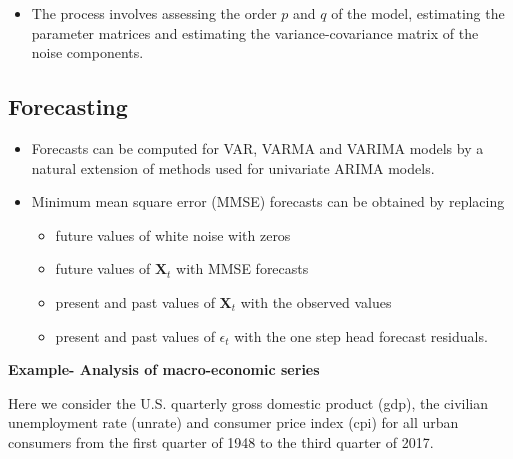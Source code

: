 \documentclass[]{book}
\providecommand{\tightlist}{%
  \setlength{\itemsep}{0pt}\setlength{\parskip}{0pt}}
\begin{document}
\begin{itemize}
\tightlist
\item
  The process involves assessing the order \(p\) and \(q\) of the model, estimating the parameter matrices and estimating the variance-covariance matrix of the noise components.
\end{itemize}

\hypertarget{forecasting-1}{%
\subsection{Forecasting}\label{forecasting-1}}

\begin{itemize}
\tightlist
\item
  Forecasts can be computed for VAR, VARMA and VARIMA models by a natural extension of methods used for univariate ARIMA models.
\item
  Minimum mean square error (MMSE) forecasts can be obtained by replacing

  \begin{itemize}
  \tightlist
  \item
    future values of white noise with zeros
  \item
    future values of \(\mathbf{X}_t\) with MMSE forecasts
  \item
    present and past values of \(\mathbf{X}_t\) with the observed values
  \item
    present and past values of \(\epsilon_t\) with the one step head forecast residuals.
  \end{itemize}
\end{itemize}

\textbf{Example- Analysis of macro-economic series}

Here we consider the U.S. quarterly gross domestic product (gdp), the civilian unemployment rate (unrate) and consumer price index (cpi) for all urban consumers from the first quarter of 1948 to the third quarter of 2017.
\end{document}
